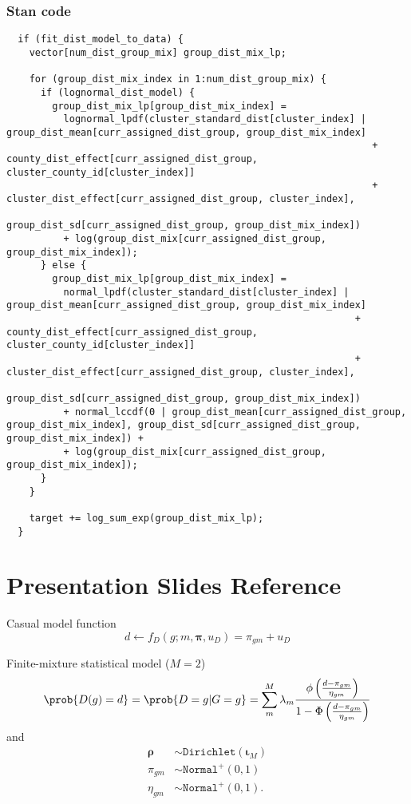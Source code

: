\documentclass{article}
\begin{document}
\subsubsection*{Stan code}
\begin{lstlisting}
  if (fit_dist_model_to_data) {
    vector[num_dist_group_mix] group_dist_mix_lp;
    
    for (group_dist_mix_index in 1:num_dist_group_mix) {
      if (lognormal_dist_model) {
        group_dist_mix_lp[group_dist_mix_index] =
          lognormal_lpdf(cluster_standard_dist[cluster_index] | group_dist_mean[curr_assigned_dist_group, group_dist_mix_index] 
                                                                + county_dist_effect[curr_assigned_dist_group, cluster_county_id[cluster_index]] 
                                                                + cluster_dist_effect[curr_assigned_dist_group, cluster_index],
                                                                group_dist_sd[curr_assigned_dist_group, group_dist_mix_index])
          + log(group_dist_mix[curr_assigned_dist_group, group_dist_mix_index]); 
      } else {
        group_dist_mix_lp[group_dist_mix_index] = 
          normal_lpdf(cluster_standard_dist[cluster_index] | group_dist_mean[curr_assigned_dist_group, group_dist_mix_index] 
                                                             + county_dist_effect[curr_assigned_dist_group, cluster_county_id[cluster_index]] 
                                                             + cluster_dist_effect[curr_assigned_dist_group, cluster_index],
                                                             group_dist_sd[curr_assigned_dist_group, group_dist_mix_index])  
          + normal_lccdf(0 | group_dist_mean[curr_assigned_dist_group, group_dist_mix_index], group_dist_sd[curr_assigned_dist_group, group_dist_mix_index]) +
          + log(group_dist_mix[curr_assigned_dist_group, group_dist_mix_index]); 
      }
    }
    
    target += log_sum_exp(group_dist_mix_lp);
  }
\end{lstlisting}

\section*{Presentation Slides Reference}
 Casual model function 
 \begin{equation*}  
   d \leftarrow f_D(g; m, \boldsymbol{\pi}, u_D) = \pi_{gm} + u_D 
 \end{equation*} 


 Finite-mixture statistical model ($M = 2$) 
 \begin{align*} 
 \prob{D(g) = d} = \prob{D = g | G = g} = \sum_m^M \lambda_m \frac{\phi\left(\frac{d - \pi_{gm}}{\eta_{gm}}\right)}{1 - \Phi\left(\frac{d - \pi_{gm}}{\eta_{gm}}\right)}  
 \end{align*} 
 and 
 \begin{align*} 
   \boldsymbol{\rho} &\sim \mathtt{Dirichlet}(\boldsymbol{\iota}_M) \\ 
   \pi_{gm} &\sim \mathtt{Normal^+}(0, 1) \\ 
   \eta_{gm} &\sim \mathtt{Normal^+}(0, 1). 
 \end{align*} 
\end{document}
